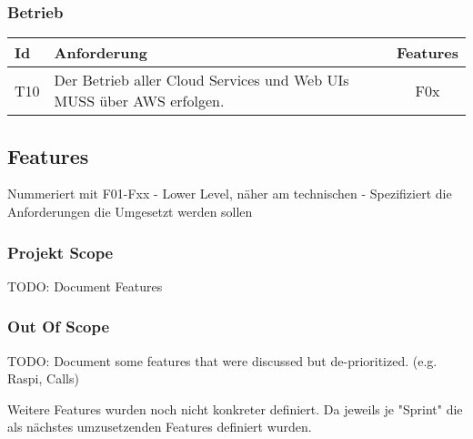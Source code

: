 \subsubsection*{Betrieb}

\begin{table}[h]
    \centering
    \begin{tabular}{|l|p{13cm}|c|}
        \hline
        \textbf{Id} & \textbf{Anforderung}                                                 & \textbf{Features} \\
        \hline
        T10         & Der Betrieb aller Cloud Services und Web UIs MUSS über AWS erfolgen. & F0x               \\
        \hline
    \end{tabular}\label{tab:userstories4}
\end{table}

\subsection{Features}\label{subsec:features}

Nummeriert mit F01-Fxx - Lower Level, näher am technischen - Spezifiziert die Anforderungen die Umgesetzt werden sollen

\subsubsection*{Projekt Scope}

TODO: Document Features


\subsubsection*{Out Of Scope}

TODO: Document some features that were discussed but de-prioritized. (e.g. Raspi, Calls)

Weitere Features wurden noch nicht konkreter definiert. Da jeweils je "Sprint" die als nächstes umzusetzenden Features definiert wurden.